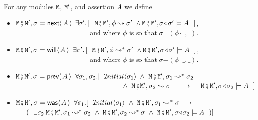 \begin{definition}  \label{def:valid:assertion:time}
For any modules $\M$, $\M'$, and assertion  $\A$ we define
  
\begin{itemize}
 \item
  $\M\mkpair \M', \sigma \models  \Next \A $
  \IFF
  $\exists \sigma'.\, [\ \ \M\mkpair \M',\phi \leadsto  \sigma' \ \wedge \M\mkpair \M',\sigma\adapt\sigma' \models \A \ \  ]$,
 \\
$\strut ~ \hspace{1.4in} $ \hfill  and where $\phi$ is
so that $\sigma$=$(\phi\cdot\_,\_)$.\item
  $\M\mkpair \M', \sigma \models  \Future \A $
  \IFF
  $\exists \sigma'.\, [\ \ \M\mkpair \M',\phi \leadsto^* \sigma' \ \wedge \M\mkpair \M',\sigma\adapt\sigma' \models \A \ \  ]$,
 \\
$\strut ~ \hspace{1.4in} $   \hfill   and where $\phi$ is
so that $\sigma$=$(\phi\cdot\_,\_)$.  
  \item
 $\M\mkpair \M', \sigma \models  \Prev \A $ \IFF
 $\forall \sigma_1, \sigma_2. [\ \ \Initial{\sigma_1}\ \wedge \   \M\mkpair \M', \sigma_1  \leadsto^*  \sigma_2 $\\
 $\strut ~ \hspace{2.1in}   \wedge \   \M\mkpair \M', \sigma_2  \leadsto   \sigma  
 \ \  \ \longrightarrow \ \ \   \
 \M\mkpair \M', \sigma\adapt\sigma_2  \models \A\ \
 ]$ 
 \item
 $\M\mkpair \M', \sigma \models  \Past \A $ \IFF
%
$\forall \sigma_1. [\ \ \Initial{\sigma_1}\ \wedge \  \M\mkpair \M',\sigma_1 \leadsto^* \sigma \longrightarrow $\\
 $\strut ~ \hspace{0.1in} $   \hfill   $(\ \  \exists \sigma_2.
 \M\mkpair \M',\sigma_1 \leadsto^* \sigma_2 \ \wedge\  \M\mkpair \M',\sigma_2 \leadsto^* \sigma \ \wedge \ 
 \M\mkpair \M', \sigma\adapt\sigma_2  \models \A\ \ 
 )]$ 
\end{itemize}
\end{definition}

